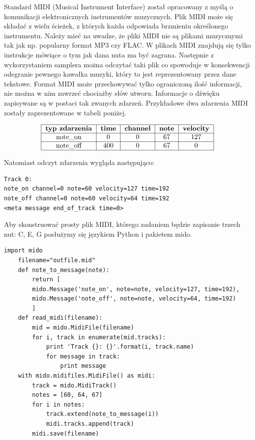 Standard MIDI (Musical Instrument Interface) został opracowany z myślą o komunikacji elektronicznych instrumentów muzycznych. Plik MIDI może się składać z wielu ścieżek, z których każda odpowiada brzmieniu określonego instrumentu. Należy mieć na uwadze, że pliki MIDI nie są plikami muzycznymi tak jak np. popularny format MP3 czy FLAC. W plikach MIDI znajdują się tylko instrukcje mówiące o tym jak dana nuta ma być zagrana. Następnie z wykorzystaniem samplera można odczytać taki plik co spowoduje w konsekwencji odegranie pewnego kawałka muzyki, który to jest reprezentowany przez dane tekstowe. Format MIDI może przechowywać tylko ograniczoną ilość informacji, nie można w nim zawrzeć chociażby słów utworu. Informacje o dźwięku zapisywane są w postaci tak zwanych zdarzeń. Przykładowe dwa zdarzenia MIDI zostały zaprezentowane w tabeli poniżej.
\begin{table}[H]
	$$\begin{tabular}{|c|c|c|c|c|}
	\hline 
	\textbf{typ zdarzenia} & \textbf{time} & \textbf{channel} & \textbf{note} & \textbf{velocity} \\ 
	\hline 
	note\_on & 0 & 0 & 67 & 127 \\ 
	\hline 
	note\_off & 400 & 0 & 67 & 0 \\ 
	\hline 
	\end{tabular} $$
	\caption{Dwa zdarzenia MIDI}
	
\end{table}


Natomiast odczyt zdarzenia wygląda następująco:

\begin{lstlisting}[caption={Odczyt pliku MIDI},captionpos=b]
Track 0: 
note_on channel=0 note=60 velocity=127 time=192
note_off channel=0 note=60 velocity=64 time=192
<meta message end_of_track time=0>
\end{lstlisting}

Aby skonstruować prosty plik MIDI, którego zadaniem będzie zapisanie trzech nut: C, E, G posłużymy się językiem Python i pakietem mido. 

\begin{lstlisting}[caption={Skrypt w Pythonie realizujący zapis określonych nut do pliku MIDI},captionpos=b]
	import mido
	filename="outfile.mid"
	def note_to_message(note):
		return [
		mido.Message('note_on', note=note, velocity=127, time=192),
		mido.Message('note_off', note=note, velocity=64, time=192)
		]
	def read_midi(filename):
		mid = mido.MidiFile(filename)
		for i, track in enumerate(mid.tracks):
			print 'Track {}: {}'.format(i, track.name)
			for message in track:
				print message
	with mido.midifiles.MidiFile() as midi:
		track = mido.MidiTrack()
		notes = [60, 64, 67]
		for i in notes:
			track.extend(note_to_message(i))
			midi.tracks.append(track)
		midi.save(filename)
\end{lstlisting}

